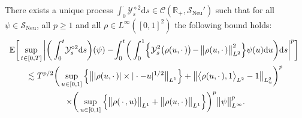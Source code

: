 \documentclass[AHL,Unicode,longabstracts]{cedram}
\DeclareMathOperator{\Neu}{Neu}
\newcommand{\mc}[1]{{\mathcal #1}}
\renewcommand{\mc}[1]{{\mathcal #1}}
\newcommand{\SN}{\ensuremath{\mc S_{\Neu}}}
\renewcommand{\geq}{\geqslant}
\newcommand*{\dd}{\mathrm{d}}
\newcommand*{\ds}{\dd s}
\newcommand*{\du}{\dd u}
\newcommand*{\mk}{\mkern -1mu}
\newcommand*{\Mk}{\mkern -2mu}
\begin{document}
\begin{lemm}\label{lem:kpz nonlin}
There exists a unique process $\int_0^{\cdot}
\mc Y_s^{\diamond 2} \ds \in \mc C (\mathbb{R}_+, \SN')$ such that for all $\psi \in \SN$, all $p \geq 1$ and all $\rho \in L^{\infty} ([0, 1]^2)$ the following bound holds:
\begin{multline}\label{eq:kpz-nonlin}
\!\!\mathbb{E} \bigg[\sup_{t \in [0, T]} \bigg| \bigg(\int_0^t \!\mc Y_s^{\diamond 2} \ds\bigg) (\psi) - \!\int_0^t \!\bigg(\int_0^1\! \Big\{ \mc Y^2_s \big(\rho (u,\cdot\,)\big) \Mk-\mk \big\| \rho (u, \cdot\,) \big\|_{L^2}^2 \Big\} \psi (u) \du \bigg) \ds \bigg|^p \bigg]\\
\lesssim T^{p / 2} \bigg(\sup_{u\in[0,1]} \Big\{\big\| | \rho (u, \cdot\,) | \times | \cdot - u |^{1/2} \big\|_{L^1}\Big\} + \big\| \big\langle \rho (u, \cdot\,), 1 \big\rangle_{L^2} - 1 \big\|_{L^2_u}\bigg)^p \vphantom{\int_0^t}\\
\times \bigg(\sup_{u\in[0,1]} \Big\{ \big\| \rho (\,\cdot\,, u) \big\|_{L^1} + \big\| \rho (u, \cdot\,)\big\|_{L^1} \Big\}\bigg)^p \big\| \psi \big\|_{L^{\infty}}^p.
\end{multline}
\end{lemm}
\end{document}
